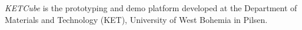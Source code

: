 {\it KETCube} \cite{ZCU:KETCube:05-2018} is the prototyping and demo platform developed at the Department of Materials and Technology (KET), University of West Bohemia in Pilsen. 
